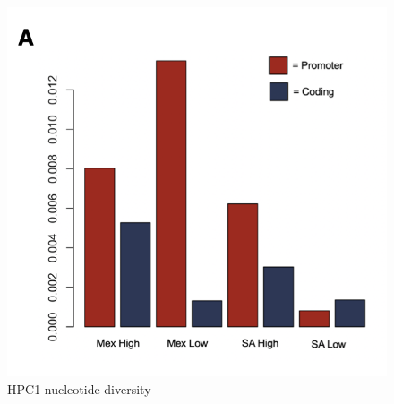 \documentclass[9pt,twocolumn,twoside,lineno]{BioRxiv}
\begin{document}
\clearpage

\begin{figure}[t]
\begin{center}
\includegraphics[width=0.3 \paperwidth]{Sup_Figures/Sup_Fig_6.png}
\caption{HPC1 nucleotide diversity}
\label{SupFig6}
\end{center}
\end{figure} 




\end{document}
